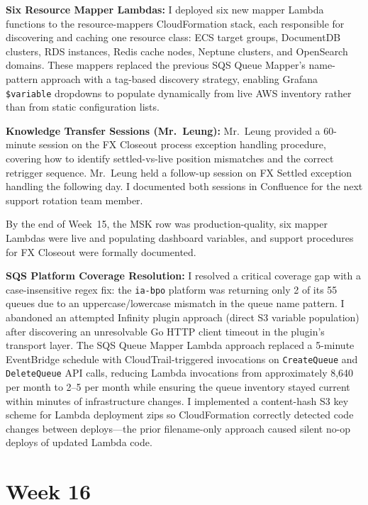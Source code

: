 \textbf{Six Resource Mapper Lambdas:} 
I deployed six new mapper Lambda functions to the resource-mappers CloudFormation stack, each responsible for
discovering and caching one resource class: ECS target groups, DocumentDB
clusters, RDS instances, Redis cache nodes, Neptune clusters, and OpenSearch
domains. These mappers replaced the previous SQS Queue Mapper's
name-pattern approach with a tag-based discovery strategy, enabling
Grafana \texttt{\$variable} dropdowns to populate dynamically from live
AWS inventory rather than from static configuration lists.

\textbf{Knowledge Transfer Sessions (Mr.\ Leung):} 
Mr.\ Leung provided a 60-minute
session on the FX Closeout process exception handling procedure, covering
how to identify settled-vs-live position mismatches and the correct
retrigger sequence. Mr.\ Leung held a follow-up session on FX Settled exception handling the following day. I documented both sessions in Confluence for the next support rotation team member.

By the end of Week~15, the MSK row was production-quality, six mapper
Lambdas were live and populating dashboard variables, and support procedures
for FX Closeout were formally documented.

\textbf{SQS Platform Coverage Resolution:} 
I resolved a critical coverage gap with a case-insensitive regex fix:
the \texttt{ia-bpo}
platform was returning only 2 of its 55 queues due to an uppercase/lowercase
mismatch in the queue name pattern. I abandoned an attempted Infinity plugin approach
(direct S3 variable population) after discovering an
unresolvable Go HTTP client timeout in the plugin's transport layer.
The SQS Queue Mapper Lambda approach replaced a 5-minute EventBridge
schedule with CloudTrail-triggered invocations on \texttt{CreateQueue}
and \texttt{DeleteQueue} API calls, reducing Lambda invocations from
approximately 8,640 per month to 2--5 per month while ensuring the
queue inventory stayed current within minutes of infrastructure changes.
I implemented a content-hash S3 key scheme for Lambda deployment zips
so CloudFormation correctly detected code changes between deploys---the
prior filename-only approach caused silent no-op deploys of updated Lambda code.


\FloatBarrier

\section{Week 16}
\label{sec:week16}

